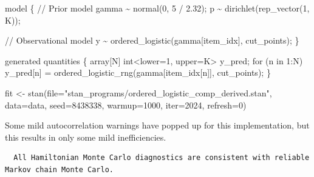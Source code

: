 \documentclass[
  letterpaper,
  DIV=11,
  numbers=noendperiod]{scrartcl}
\newenvironment{Shaded}{\begin{snugshade}}{\end{snugshade}}
\newcommand{\AttributeTok}[1]{\textcolor[rgb]{0.40,0.45,0.13}{#1}}
\newcommand{\CommentTok}[1]{\textcolor[rgb]{0.37,0.37,0.37}{#1}}
\newcommand{\ControlFlowTok}[1]{\textcolor[rgb]{0.00,0.23,0.31}{#1}}
\newcommand{\DataTypeTok}[1]{\textcolor[rgb]{0.68,0.00,0.00}{#1}}
\newcommand{\DecValTok}[1]{\textcolor[rgb]{0.68,0.00,0.00}{#1}}
\newcommand{\FloatTok}[1]{\textcolor[rgb]{0.68,0.00,0.00}{#1}}
\newcommand{\FunctionTok}[1]{\textcolor[rgb]{0.28,0.35,0.67}{#1}}
\newcommand{\KeywordTok}[1]{\textcolor[rgb]{0.00,0.23,0.31}{#1}}
\newcommand{\NormalTok}[1]{\textcolor[rgb]{0.00,0.23,0.31}{#1}}
\newcommand{\OtherTok}[1]{\textcolor[rgb]{0.00,0.23,0.31}{#1}}
\newcommand{\SpecialCharTok}[1]{\textcolor[rgb]{0.37,0.37,0.37}{#1}}
\newcommand{\StringTok}[1]{\textcolor[rgb]{0.13,0.47,0.30}{#1}}
\begin{document}
\begin{codelisting}
\begin{Shaded}
\begin{Highlighting}[]
\KeywordTok{model}\NormalTok{ \{}
  \CommentTok{// Prior model}
\NormalTok{  gamma \textasciitilde{} normal(}\DecValTok{0}\NormalTok{, }\DecValTok{5}\NormalTok{ / }\FloatTok{2.32}\NormalTok{);}
\NormalTok{  p \textasciitilde{} dirichlet(rep\_vector(}\DecValTok{1}\NormalTok{, K));}

  \CommentTok{// Observational model}
\NormalTok{  y \textasciitilde{} ordered\_logistic(gamma[item\_idx], cut\_points);}
\NormalTok{\}}

\KeywordTok{generated quantities}\NormalTok{ \{}
  \DataTypeTok{array}\NormalTok{[N] }\DataTypeTok{int}\NormalTok{\textless{}}\KeywordTok{lower}\NormalTok{=}\DecValTok{1}\NormalTok{, }\KeywordTok{upper}\NormalTok{=K\textgreater{} y\_pred;}
  \ControlFlowTok{for}\NormalTok{ (n }\ControlFlowTok{in} \DecValTok{1}\NormalTok{:N)}
\NormalTok{    y\_pred[n] = ordered\_logistic\_rng(gamma[item\_idx[n]], cut\_points);}
\NormalTok{\}}
\end{Highlighting}
\end{Shaded}

\end{codelisting}

\begin{Shaded}
\begin{Highlighting}[]
\NormalTok{fit }\OtherTok{\textless{}{-}} \FunctionTok{stan}\NormalTok{(}\AttributeTok{file=}\StringTok{"stan\_programs/ordered\_logistic\_comp\_derived.stan"}\NormalTok{,}
            \AttributeTok{data=}\NormalTok{data, }\AttributeTok{seed=}\DecValTok{8438338}\NormalTok{,}
            \AttributeTok{warmup=}\DecValTok{1000}\NormalTok{, }\AttributeTok{iter=}\DecValTok{2024}\NormalTok{, }\AttributeTok{refresh=}\DecValTok{0}\NormalTok{)}
\end{Highlighting}
\end{Shaded}

Some mild autocorrelation warnings have popped up for this
implementation, but this results in only some mild inefficiencies.

\begin{Shaded}
\end{Shaded}

\begin{verbatim}
  All Hamiltonian Monte Carlo diagnostics are consistent with reliable
Markov chain Monte Carlo.
\end{verbatim}
\end{document}
